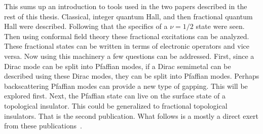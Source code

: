 This sums up an introduction to tools used in the two papers described in the rest of this thesis. Classical, integer quantum Hall, and then fractional quantum Hall were described. Following that the specifics of a $\nu=1/2$ state were seen. Then using conformal field theory these fractional excitations can be analyzed. These fractional states can be written in terms of electronic operators and vice versa. Now using this machinery a few questions can be addressed. First, since a Dirac mode can be split into Pfaffian modes, if a Dirac semimetal can be described using these Dirac modes, they can be split into Pfaffian modes. Perhaps backscattering Pfaffian modes can provide a new type of gapping. This will be explored first. Next, the Pfaffian state can live on the surface state of a topological insulator. This could be generalized to fractional topological insulators. That is the second publication. What follows is a mostly a direct exert from these publications~\cite{RazaSirotaTeo17,SahooSirotaChoTeo17}.
 


